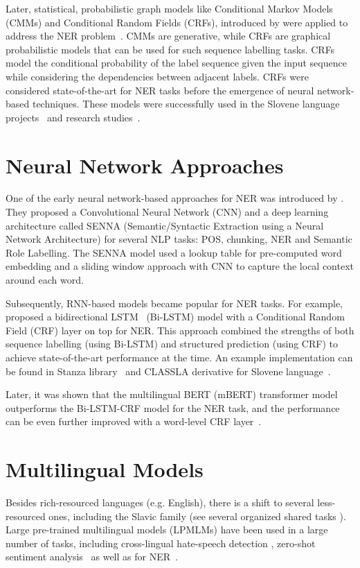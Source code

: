 Later, statistical, probabilistic graph models like Conditional Markov Models \parencite{Leek1997InformationEU, Borthwick1999Maximum, mccallum2000MaximumEM} (CMMs) and Conditional Random Fields (CRFs), introduced by \textcite{lafferty2001ConditionalRF} were applied to address the NER problem~\parencite{finkel2005incorporating}.
CMMs are generative, while CRFs are graphical probabilistic models that can be used for such sequence labelling tasks.
CRFs model the conditional probability of the label sequence given the input sequence while considering the dependencies between adjacent labels. 
CRFs were considered state-of-the-art for NER tasks before the emergence of neural network-based techniques. 
These models were successfully used in the Slovene language projects~\parencite{ReLDI} and research studies~\parencite{stajner2013razpoz}.

\section{Neural Network Approaches}
One of the early neural network-based approaches for NER was introduced by \textcite{collobert2011natural}. 
They proposed a Convolutional Neural Network (CNN) and a deep learning architecture called SENNA (Semantic/Syntactic Extraction using a Neural Network Architecture) for several NLP tasks: POS, chunking, NER and Semantic Role Labelling. 
The SENNA model used a lookup table for pre-computed word embedding and a sliding window approach with CNN to capture the local context around each word.

Subsequently, RNN-based models became popular for NER tasks.
For example, \textcite{lample2016neural} proposed a bidirectional LSTM~\parencite{hochreiter1997lstm, graves2013bilstm} (Bi-LSTM) model with a Conditional Random Field (CRF) layer on top for NER. 
This approach combined the strengths of both sequence labelling (using Bi-LSTM) and structured prediction (using CRF) to achieve state-of-the-art performance at the time.
An example implementation can be found in Stanza library~\parencite{qi2020stanza} and CLASSLA derivative for Slovene language~\parencite{ljubesic-dobrovoljc-2019-neural}.

Later, it was shown that the multilingual BERT (mBERT) transformer model outperforms the Bi-LSTM-CRF model for the NER task, and the performance can be even further improved with a word-level CRF layer~\parencite{arkhipov2019tuning}. 

\section{Multilingual Models}
Besides rich-resourced languages (e.g. English), there is a shift to several less-resourced ones, including the Slavic family (see several organized shared tasks \parencite{piskorski-etal-2017-first,piskorski-etal-2019-second,piskorski-etal-2021-slav}).
Large pre-trained multilingual models (LPMLMs) have been used in a large number of tasks, including cross-lingual hate-speech detection \textcite{pelicon2021offensive}, zero-shot sentiment analysis~\parencite{pelicon2020zero} as well as for NER~\parencite{arkhipov2019tuning,suppa2021benchmarking}.

